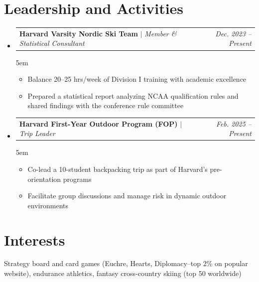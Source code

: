 \documentclass[letterpaper,11pt]{article}
\makeatletter
\newcommand{\resumeItem}[1]{
  \item\small{
    {#1 \vspace{-2pt}}
  }
}
\newcommand{\resumeProjectHeading}[2]{
    \vspace{-6pt}\item
    \begin{tabular*}{0.97\textwidth}{l@{\extracolsep{\fill}}r}
      \small#1 & #2 \\
    \end{tabular*}\vspace{-5pt}
}
\newcommand{\resumeSubHeadingListStart}{\begin{itemize}[leftmargin=0.15in, label={}]}
\newcommand{\resumeSubHeadingListEnd}{\end{itemize}}
\newcommand{\resumeItemListStart}{\begin{itemize}}
\newcommand{\resumeItemListEnd}{\end{itemize}\vspace{-5pt}}
\makeatother
\begin{document}

    \vspace{-7pt}

    \section{Leadership and Activities}
\resumeSubHeadingListStart
       
\vspace{2pt}
       
       
       \resumeProjectHeading
  {\textbf{Harvard Varsity Nordic Ski Team} $|$ 
   \footnotesize\emph{Member \& Statistical Consultant}}{\small{\textit{Dec. 2023 -- Present}}}
\begin{addmargin}[1em]{5em}
\resumeItemListStart
  \resumeItem{Balance 20--25 hrs/week of Division I training with academic excellence}
  \resumeItem{Prepared a statistical report analyzing NCAA qualification rules and shared findings with the conference rule committee}
\resumeItemListEnd

\end{addmargin}

\vspace{5pt}
\resumeProjectHeading
  {\textbf{Harvard First-Year Outdoor Program (FOP)} $|$ 
   \footnotesize\emph{Trip Leader}}{\small{\textit{Feb. 2025 -- Present}}}
\begin{addmargin}[1em]{5em}
\resumeItemListStart
  \resumeItem{Co-lead a 10-student backpacking trip as part of Harvard's pre-orientation programs}
  \resumeItem{Facilitate group discussions and manage risk in dynamic outdoor environments}
\resumeItemListEnd
\end{addmargin}
\resumeSubHeadingListEnd

\vspace{-8pt}

\section{Interests}

\vspace{-5pt}

\small{Strategy board and card games (Euchre, Hearts, Diplomacy--top 2\% on popular website), endurance athletics, fantasy cross-country skiing (top 50 worldwide)}


          

 
\end{document}
